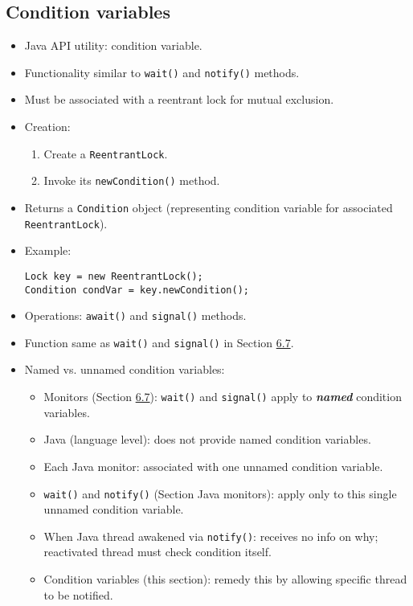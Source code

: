 \subsection{Condition variables}
\begin{itemize}
    \item Java API utility: condition variable.
    \item Functionality similar to \texttt{wait()} and \texttt{notify()} methods.
    \item Must be associated with a reentrant lock for mutual exclusion.
    \item Creation:
    \begin{enumerate}
        \item Create a \texttt{ReentrantLock}.
        \item Invoke its \texttt{newCondition()} method.
    \end{enumerate}
    \item Returns a \texttt{Condition} object (representing condition variable for associated \texttt{ReentrantLock}).
    \item Example:
    \begin{verbatim}
Lock key = new ReentrantLock();
Condition condVar = key.newCondition();
    \end{verbatim}
    \item Operations: \texttt{await()} and \texttt{signal()} methods.
    \item Function same as \texttt{wait()} and \texttt{signal()} in Section \hyperref[sec:6.7]{6.7}.
    \item Named vs. unnamed condition variables:
    \begin{itemize}
        \item Monitors (Section \hyperref[sec:6.7]{6.7}): \texttt{wait()} and \texttt{signal()} apply to \textbf{\textit{named}} condition variables.
        \item Java (language level): does not provide named condition variables.
        \item Each Java monitor: associated with one unnamed condition variable.
        \item \texttt{wait()} and \texttt{notify()} (Section Java monitors): apply only to this single unnamed condition variable.
        \item When Java thread awakened via \texttt{notify()}: receives no info on why; reactivated thread must check condition itself.
        \item Condition variables (this section): remedy this by allowing specific thread to be notified.

\end{itemize}
\end{itemize}
